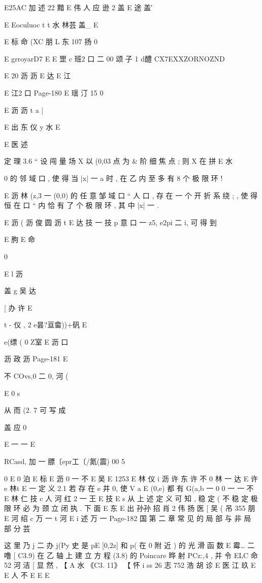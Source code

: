 {{{{{{{{{{{{{{{{{{E25AC 加 述 22 黯 E 伟 人 应 逊 2 盖 E 途 盖′

E
Eoculuoc t t 水 林芸
盖_ E

E 标 命 (XC 朋 L 东 107 扬 0

E grroyarD7
E
E 罡 c 班2 口 二 00 颂 子 1
d醴 CX7EXXZORNOZND

E 20 沥 沥
E 达
E 江

E 江2 口
Page-180
E 瑶 汀 15 0

E 沥 沥 t a |

E 出 东 仪 y 水
E

E 医 述

定 理 3.6 “ 设 闯 量 场 X 以 (0,03 点 为 & 阶 细 焦 点 ; 则 X 在 拼
E 水

0
的 邻 域 口 , 使 得 当 |x| 一 a 时 , 在 乙 内 至 多 有 8 个 极 限 环 !

E 沥 林
(z,3 一 (0,0) 的 任 意 邹 域 口 “ 人 口 , 存 在 一 个 开 折 系 绕 ; , 使 得
恒 在 口 “ 内 恰 有 了 个 极 限 环 , 其 中 |x| 一 .

E 沥 ( 沥 俊 圆 沥 t
E 达 技 一 技 p
意 口 一 z5, e2pi 二 i, 可 得 到

{ E 朐
E 命

0

E l 沥

盖 g 吴 达

[
办 许
E

t - 仪 ,
2 e昙?亘畲))+矾 E

e(缥 (
0 Z室 E 沥 口

沥 政 沥
Page-181
E

不 COvs,0 二 0,
河 (

E
0 s

从 而 (2. 7 可 写 成

盖 应 0

E 一 一
E

RCasd, 加 一 膘〔epr工〔/氮(震) 00
5

0
E 0 泊
E 标
E 沥 0 一 不
E 吴
E 1253
E 林 仪
i 沥 许 东 许 不 0 林 一 达
E 许 e 林t E 一
定 义 2.1 若 存 在 e 井 0, 使 V a E (0,e) 都 有 G(a,b 一 0
0 一 一 不
E 林 仁 技 c 人 河 红 2 一 王
E 技
E s
从 上 述 定 义 可 知 , 稳 定 ( 不 稳 定 极 限 环 必 为 颈 立 闭 执 . 下 面
E 东
E 出 孙孙 招 肖 2 伟 扬 医 [ 吴 ( 吊 355 朋
E 河 绍 c 万 一 t 河
E i 述 万 一
Page-182
国 第 二 章 常 见 的 局 部 与 非 局 部 分 芸

这 里 乃 j 二 办 j(Py 史 是 pE [0,2z] 和 p( 在 0 附 近 ) 的 光 滑 函 数
E
霉… 二 噜 [ C3.9)
在 乙 轴 上 建 立 方 程 (3.8) 的 Poincare 晔 射 PCz:,4 , 并 令
ELC 命 52 河 洁 [
显 然 ,
【 A 水 《C3. 11》
【 怀 i ss 26 志 752 浩 胡 诊
E
医 江 玖
E
E 人 不
E
E
E

}}}}}}}}}}}}}}}}}}}
